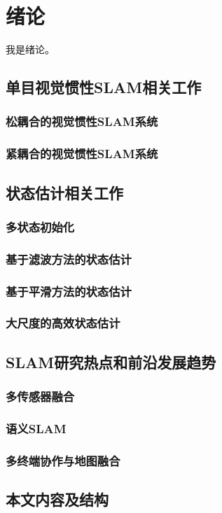 \chapter{绪论}

我是绪论。

\section{单目视觉惯性SLAM相关工作}
\subsection{松耦合的视觉惯性SLAM系统}
\subsection{紧耦合的视觉惯性SLAM系统}

\section{状态估计相关工作}
\subsection{多状态初始化}
\subsection{基于滤波方法的状态估计}
\subsection{基于平滑方法的状态估计}
\subsection{大尺度的高效状态估计}

\section{SLAM研究热点和前沿发展趋势}
\subsection{多传感器融合}
\subsection{语义SLAM}
\subsection{多终端协作与地图融合}

\section{本文内容及结构}
